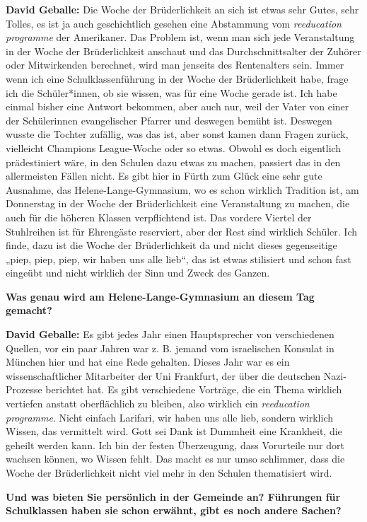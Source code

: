 \textbf{David Geballe:} Die Woche der Brüderlichkeit an sich ist etwas sehr Gutes, sehr Tolles, es ist ja auch geschichtlich gesehen eine Abstammung vom \textit{reeducation programme} der Amerikaner. Das Problem ist, wenn man sich jede Veranstaltung in der Woche der Brüderlichkeit anschaut und das Durchschnittsalter der Zuhörer oder Mitwirkenden berechnet, wird man jenseits des Rentenalters sein. Immer wenn ich eine Schulklassenführung in der Woche der Brüderlichkeit habe, frage ich die Schüler*innen, ob sie wissen, was für eine Woche gerade ist. Ich habe einmal bisher eine Antwort bekommen, aber auch nur, weil der Vater von einer der Schülerinnen evangelischer Pfarrer und deswegen bemüht ist. Deswegen wusste die Tochter zufällig, was das ist, aber sonst kamen dann Fragen zurück, vielleicht Champions League-Woche oder so etwas. Obwohl es doch eigentlich prädestiniert wäre, in den Schulen dazu etwas zu machen, passiert das in den allermeisten Fällen nicht. Es gibt hier in Fürth zum Glück eine sehr gute Ausnahme, das Helene-Lange-Gymnasium, wo es schon wirklich Tradition ist, am Donnerstag in der Woche der Brüderlichkeit eine Veranstaltung zu machen, die auch für die höheren Klassen verpflichtend ist. Das vordere Viertel der Stuhlreihen ist für Ehrengäste reserviert, aber der Rest sind wirklich Schüler. Ich finde, dazu ist die Woche der Brüderlichkeit da und nicht dieses gegenseitige „piep, piep, piep, wir haben uns alle lieb“, das ist etwas stilisiert und schon fast eingeübt und nicht wirklich der Sinn und Zweck des Ganzen. 

\textbf{Was genau wird am Helene-Lange-Gymnasium an diesem Tag gemacht?} 

\textbf{David Geballe:} Es gibt jedes Jahr einen Hauptsprecher von verschiedenen Quellen, vor ein paar Jahren war z. B. jemand vom israelischen Konsulat in München hier und hat eine Rede gehalten. Dieses Jahr war es ein wissenschaftlicher Mitarbeiter der Uni Frankfurt, der über die deutschen Nazi-Prozesse berichtet hat. Es gibt verschiedene Vorträge, die ein Thema wirklich vertiefen anstatt oberflächlich zu bleiben, also wirklich ein \textit{reeducation programme}. Nicht einfach Larifari, wir haben uns alle lieb, sondern wirklich Wissen, das vermittelt wird. Gott sei Dank ist Dummheit eine Krankheit, die geheilt werden kann. Ich bin der festen Überzeugung, dass Vorurteile nur dort wachsen können, wo Wissen fehlt. Das macht es nur umso schlimmer, dass die Woche der Brüderlichkeit nicht viel mehr in den Schulen thematisiert wird. 

\textbf{Und was bieten Sie persönlich in der Gemeinde an? Führungen für Schulklassen haben sie schon erwähnt, gibt es noch andere Sachen?} 

